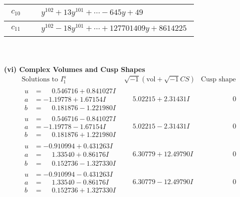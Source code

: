 \documentclass[1p]{elsarticle_modified}
\theoremstyle{definition}
\newcommand{\I}{\sqrt{-1}}
\begin{document}
\begin{tabular}{m{50pt}|m{274pt}}
\hline $$\begin{aligned}c_{10}\end{aligned}$$&$\begin{aligned}
&y^{102}+13 y^{101}+\cdots-645 y+49
\end{aligned}$\\
\hline $$\begin{aligned}c_{11}\end{aligned}$$&$\begin{aligned}
&y^{102}-18 y^{101}+\cdots+127701409 y+8614225
\end{aligned}$\\
\hline
\end{tabular}\\~\\
\newpage\flushleft \textbf{(vi) Complex Volumes and Cusp Shapes}
$$\begin{array}{c|c|c}  
\text{Solutions to }I^u_{1}& \I (\text{vol} + \sqrt{-1}CS) & \text{Cusp shape}\\
 \hline 
\begin{aligned}
u &= \phantom{-}0.546716 + 0.841027 I \\
a &= -1.19778 + 1.67154 I \\
b &= \phantom{-}0.181876 - 1.221980 I\end{aligned}
 & \phantom{-}5.02215 + 2.31431 I & \phantom{-0.000000 } 0 \\ \hline\begin{aligned}
u &= \phantom{-}0.546716 - 0.841027 I \\
a &= -1.19778 - 1.67154 I \\
b &= \phantom{-}0.181876 + 1.221980 I\end{aligned}
 & \phantom{-}5.02215 - 2.31431 I & \phantom{-0.000000 } 0 \\ \hline\begin{aligned}
u &= -0.910994 + 0.431263 I \\
a &= \phantom{-}1.33540 + 0.86176 I \\
b &= \phantom{-}0.152736 - 1.327330 I\end{aligned}
 & \phantom{-}6.30779 + 12.49790 I & \phantom{-0.000000 } 0 \\ \hline\begin{aligned}
u &= -0.910994 - 0.431263 I \\
a &= \phantom{-}1.33540 - 0.86176 I \\
b &= \phantom{-}0.152736 + 1.327330 I\end{aligned}
 & \phantom{-}6.30779 - 12.49790 I & \phantom{-0.000000 } 0 \\ \hline\begin{aligned}

\end{aligned}
\end{array}$$
\end{document}
